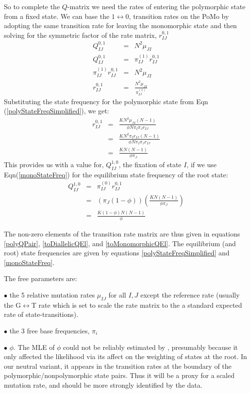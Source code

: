 \documentclass{llncs}
\newcommand{\polyProb}{\ensuremath{\phi}}
\newcommand{\Knorm}{\ensuremath{K}}
\newcommand{\pomo}{PoMo\xspace}
\begin{document}
So to complete the $Q$-matrix we need the rates of entering the polymorphic state from a fixed state.
We can base the $1\leftrightarrow 0$, transition rates on the \pomo by adopting 
    the same transition rate for leaving the monomorphic state and
    then solving for the symmetric factor of the rate matrix, $r_{IJ}^{0,1}$
\begin{eqnarray}
    Q_{IJ}^{0,1} & = & N^2 \mu_{JI}  \label{toDiallelicQEl}\\
    Q_{IJ}^{0,1} & = & \pi_{IJ}^{(1)} r_{IJ}^{0,1} \nonumber\\
    \pi_{IJ}^{(1)} r_{IJ}^{0,1}& = & N^2 \mu_{JI}  \nonumber \\
    r_{IJ}^{0,1}& = & \frac{N^2 \mu_{JI}}{\pi_{IJ}^{(1)}}
\end{eqnarray}
Substituting the state frequency for the polymorphic state from Eqn (\ref{polyStateFreqSimplified}), we get:
\begin{eqnarray}
    r_{IJ}^{0,1} & = & \frac{\Knorm N^2 \mu_{JI}(N-1)}{\polyProb N\pi_I\pi_J r_{IJ}} \nonumber \\
    & = & \frac{\Knorm N^2 \pi_{I}r_{IJ}(N-1)}{\polyProb N\pi_I\pi_J r_{IJ}} \nonumber \\
                 & = & \frac{\Knorm N(N-1)}{\polyProb \pi_J} 
\end{eqnarray}
This provides us with a value for, $Q_{IJ}^{1,0}$, the fixation of state $I$, if we use Eqn(\ref{monoStateFreq}) for the equilibrium state frequency of the root state:
\begin{eqnarray}
    Q_{IJ}^{1,0} & = & \pi_{IJ}^{(0)} r_{IJ}^{0,1} \nonumber \\
                 & = & \left(\pi_J(1-\polyProb)\right)\left(\frac{\Knorm N(N-1)}{\polyProb \pi_J} \right) \nonumber \\
                 & = & \frac{\Knorm (1-\polyProb)N(N-1)}{\polyProb } \label{toMonomorphicQEl}
\end{eqnarray}

The non-zero elements of the transition rate matrix are thus given in equations \ref{polyQPair}, \ref{toDiallelicQEl}, and \ref{toMonomorphicQEl}.
The equilibrium (and root) state frequencies are given by equations \ref{polyStateFreqSimplified} and \ref{monoStateFreq}.

The free parameters are:
\begin{compactitem}
    \item[$\bullet$] the 5 relative mutation rates $\mu_{IJ}$ for all $I,J$ except the reference rate (usually the G$\leftrightarrow$T rate which is set to scale the rate matrix to the a standard expected rate of state-transitions).
    \item[$\bullet$] the 3 free base frequencies, $\pi_i$
    \item[$\bullet$] $\polyProb$. The MLE of $\polyProb$ could not be reliably estimated by \cite{DeMaioSK2013}, presumably because it only
    affected the likelihood via its affect on the weighting of states at the root.
    In our neutral variant, it appears in the transition rates at the boundary of the polymorphic/nonpolymorphic state pairs.
    Thus it will be a proxy for a scaled mutation rate, and should be more strongly identified by the data.
\end{compactitem}
\end{document}
